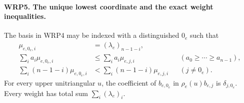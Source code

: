 \paragraph{WRP5. The unique lowest coordinate and the exact weight inequalities.}
\label{claim:WRP5}
The basis in WRP4 may be indexed with a distinguished $0_e$
such that
\begin{align}
 \mu_{e,0_e,i}&=(\lambda_e)_{n-1-i},\\
 \sum_i a_i\mu_{e,0_e,i}&\leq\sum_i a_i\mu_{e,j,i}
                         &&(a_0\geq\cdots\geq a_{n-1}),\\
 \sum_i(n-1-i)\mu_{e,0_e,i}
                 &<\sum_i(n-1-i)\mu_{e,j,i} &&(j\ne0_e).
 \label{eq:wrp-weights}
\end{align}
For every upper unitriangular $u$, the coefficient of
$b_{e,0_e}$ in $\rho_e(u)b_{e,j}$ is $\delta_{j,0_e}$.
Every weight has total sum $\sum_i(\lambda_e)_i$.
